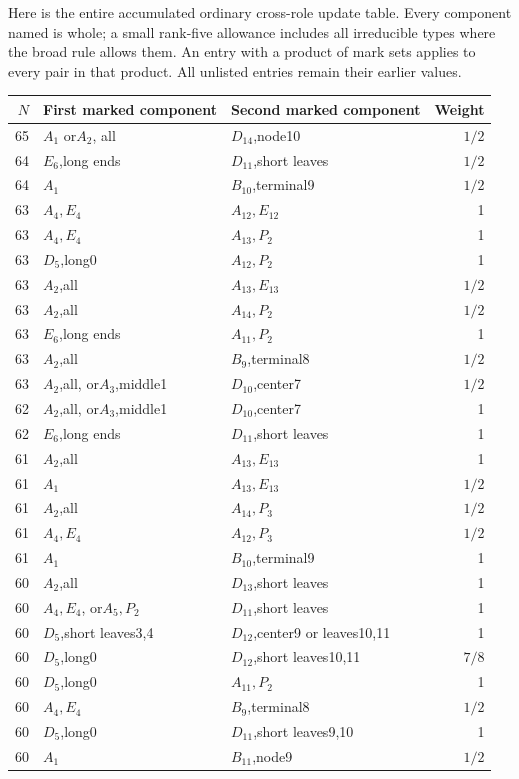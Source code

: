 \documentclass[11pt]{article}
\theoremstyle{remark}\newtheorem{remark}[theorem]{Remark}
\begin{document}
Here is the entire accumulated ordinary cross-role update table.
Every component named is whole; a small rank-five allowance includes
all irreducible types where the broad rule allows them. An entry
with a product of mark sets applies to every pair in that product.
All unlisted entries remain their earlier values.
{\small
\begin{longtable}{r p{}p{}r}
\toprule$N$&First marked component&Second marked component&Weight\\\midrule
\endhead
65&$A_1$ or$A_2$, all&$D_{14}$,node10&$1/2$\\
64&$E_6$,long ends&$D_{11}$,short leaves&$1/2$\\
64&$A_1$&$B_{10}$,terminal9&$1/2$\\
63&$A_4,E_4$&$A_{12},E_{12}$&1\\
63&$A_4,E_4$&$A_{13},P_2$&1\\
63&$D_5$,long0&$A_{12},P_2$&1\\
63&$A_2$,all&$A_{13},E_{13}$&$1/2$\\
63&$A_2$,all&$A_{14},P_2$&$1/2$\\
63&$E_6$,long ends&$A_{11},P_2$&1\\
63&$A_2$,all&$B_9$,terminal8&$1/2$\\
63&$A_2$,all, or$A_3$,middle1&$D_{10}$,center7&$1/2$\\
62&$A_2$,all, or$A_3$,middle1&$D_{10}$,center7&1\\
62&$E_6$,long ends&$D_{11}$,short leaves&1\\
61&$A_2$,all&$A_{13},E_{13}$&1\\
61&$A_1$&$A_{13},E_{13}$&$1/2$\\
61&$A_2$,all&$A_{14},P_3$&$1/2$\\
61&$A_4,E_4$&$A_{12},P_3$&$1/2$\\
61&$A_1$&$B_{10}$,terminal9&1\\
60&$A_2$,all&$D_{13}$,short leaves&1\\
60&$A_4,E_4$, or$A_5,P_2$&$D_{11}$,short leaves&1\\
60&$D_5$,short leaves3,4&$D_{12}$,center9 or leaves10,11&1\\
60&$D_5$,long0&$D_{12}$,short leaves10,11&$7/8$\\
60&$D_5$,long0&$A_{11},P_2$&1\\
60&$A_4,E_4$&$B_9$,terminal8&$1/2$\\
60&$D_5$,long0&$D_{11}$,short leaves9,10&1\\
60&$A_1$&$B_{11}$,node9&$1/2$\\

\end{longtable}}
\end{document}
